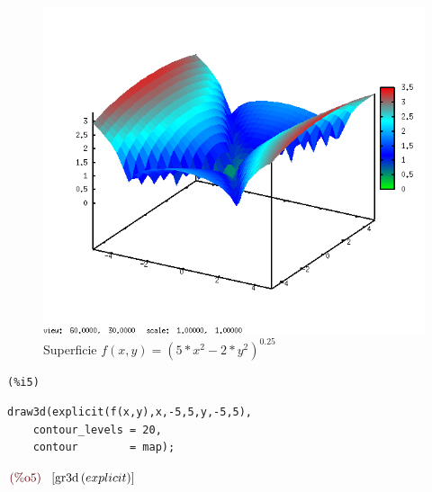 \documentclass[12pt]{article}
\begin{document}
\begin{figure}[H]
\centering
\includegraphics[scale=0.5]{4.png}
\caption{Superficie $f(x,y)= (5*x^2-2*y^2)^0.25$ }
\end{figure}

\noindent

\begin{minipage}[t]{8ex}{\color{red}\bf
\begin{verbatim}
(%i5) 
\end{verbatim}}
\end{minipage}
\begin{minipage}[t]{\textwidth}{\color{blue}
\begin{verbatim}
draw3d(explicit(f(x,y),x,-5,5,y,-5,5),
    contour_levels = 20,
    contour        = map);
\end{verbatim}}
\end{minipage}

\begin{math}\displaystyle
\parbox{8ex}{\color{labelcolor}(\%o5) }
[\mathrm{gr3d}\left( explicit\right) ]
\end{math}
\end{document}
